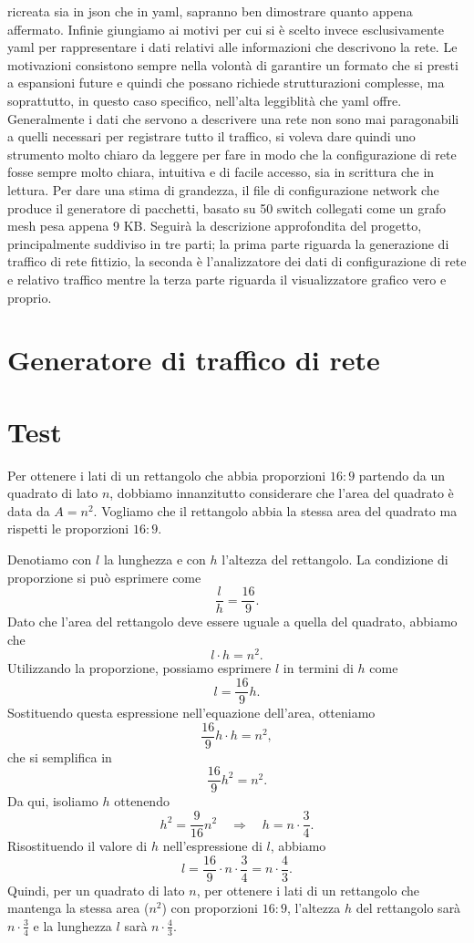 \documentclass[binding=0.6cm]{sapthesis}
\begin{document}
ricreata sia in json che in yaml, sapranno ben
dimostrare quanto appena affermato.
Infinie giungiamo ai motivi per cui si è scelto invece esclusivamente yaml per rappresentare i 
dati relativi alle informazioni che descrivono la rete. Le motivazioni consistono sempre nella volontà
di garantire un formato che si presti a espansioni future e quindi che possano richiede strutturazioni complesse, ma soprattutto,
in questo caso specifico, nell'alta leggiblità che yaml offre. Generalmente i dati che servono a descrivere una rete non sono mai paragonabili a quelli
necessari per registrare tutto il traffico, si voleva dare quindi uno strumento molto chiaro da leggere per fare in modo che la configurazione di rete
fosse sempre molto chiara, intuitiva e di facile accesso, sia in scrittura che in lettura. 
Per dare una stima di grandezza, il file
di configurazione network che produce il generatore di pacchetti, basato su 50 switch collegati come un grafo mesh pesa appena 9 KB.
Seguirà la descrizione approfondita del progetto, principalmente suddiviso in tre parti; la prima 
parte riguarda la generazione di traffico di rete fittizio, la seconda è l'analizzatore dei dati di configurazione di rete e relativo traffico mentre la terza
parte riguarda il visualizzatore grafico vero e proprio.

\chapter{Generatore di traffico di rete}


\chapter{Test}
Per ottenere i lati di un rettangolo che abbia proporzioni $16:9$ partendo da un 
quadrato di lato $n$, dobbiamo innanzitutto considerare che l'area del quadrato è data 
da $A = n^2$. Vogliamo che il rettangolo abbia la stessa area del quadrato ma rispetti
 le proporzioni $16:9$.

Denotiamo con $l$ la lunghezza e con $h$ l'altezza del rettangolo. La condizione di proporzione si può esprimere come
\[
\frac{l}{h} = \frac{16}{9}.
\]
Dato che l'area del rettangolo deve essere uguale a quella del quadrato, abbiamo che
\[
l \cdot h = n^2.
\]
Utilizzando la proporzione, possiamo esprimere $l$ in termini di $h$ come
\[
l = \frac{16}{9}h.
\]
Sostituendo questa espressione nell'equazione dell'area, otteniamo
\[
\frac{16}{9}h \cdot h = n^2,
\]
che si semplifica in
\[
\frac{16}{9}h^2 = n^2.
\]
Da qui, isoliamo $h$ ottenendo
\[
h^2 = \frac{9}{16}n^2 \quad \Longrightarrow \quad h = n \cdot \frac{3}{4}.
\]
Risostituendo il valore di $h$ nell'espressione di $l$, abbiamo
\[
l = \frac{16}{9} \cdot n \cdot \frac{3}{4} = n \cdot \frac{4}{3}.
\]
Quindi, per un quadrato di lato $n$, per ottenere i lati di un rettangolo che mantenga la stessa area ($n^2$) con proporzioni $16:9$, l'altezza $h$ del rettangolo sarà $n \cdot \frac{3}{4}$ e la lunghezza $l$ sarà $n \cdot \frac{4}{3}$.
\end{document}
